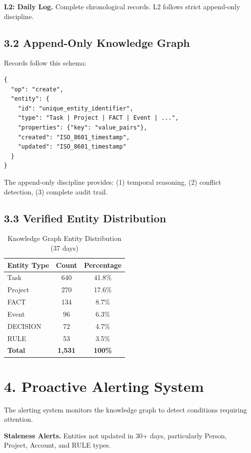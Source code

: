 \documentclass[11pt,a4paper]{article}
\begin{document}
\textbf{L2: Daily Log.} Complete chronological records. L2 follows strict append-only discipline.

\subsection{3.2 Append-Only Knowledge Graph}

Records follow this schema:

\begin{verbatim}
{
  "op": "create",
  "entity": {
    "id": "unique_entity_identifier",
    "type": "Task | Project | FACT | Event | ...",
    "properties": {"key": "value_pairs"},
    "created": "ISO_8601_timestamp",
    "updated": "ISO_8601_timestamp"
  }
}
\end{verbatim}

The append-only discipline provides: (1) temporal reasoning, (2) conflict detection, (3) complete audit trail.

\subsection{3.3 Verified Entity Distribution}

\begin{table}[h]
\centering
\caption{Knowledge Graph Entity Distribution (37 days)}
\begin{tabular}{|l|c|c|}
\hline
\textbf{Entity Type} & \textbf{Count} & \textbf{Percentage} \\
\hline
Task & 640 & 41.8\% \\
Project & 270 & 17.6\% \\
FACT & 134 & 8.7\% \\
Event & 96 & 6.3\% \\
DECISION & 72 & 4.7\% \\
RULE & 53 & 3.5\% \\
\hline
\textbf{Total} & \textbf{1,531} & \textbf{100\%} \\
\hline
\end{tabular}
\end{table}

\section{4. Proactive Alerting System}

The alerting system monitors the knowledge graph to detect conditions requiring attention.

\textbf{Staleness Alerts.} Entities not updated in 30+ days, particularly Person, Project, Account, and RULE types.
\end{document}
